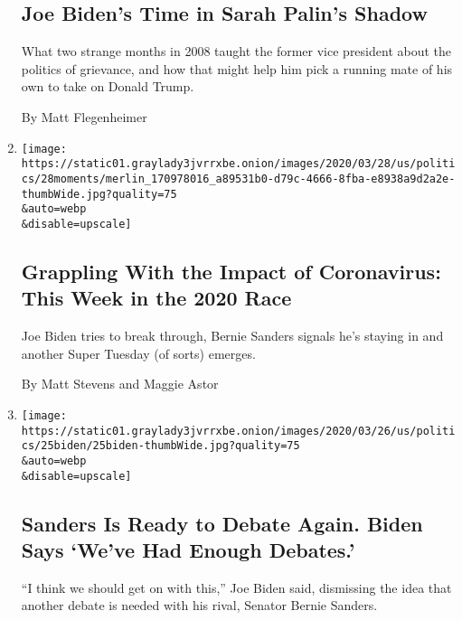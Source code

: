 \begin{enumerate}
  \hypertarget{joe-bidens-time-in-sarah-palins-shadow}{%
  \subsection{Joe Biden's Time in Sarah Palin's
  Shadow}\label{joe-bidens-time-in-sarah-palins-shadow}}

  What two strange months in 2008 taught the former vice president about
  the politics of grievance, and how that might help him pick a running
  mate of his own to take on Donald Trump.

  By Matt Flegenheimer
\item
  \href{/2020/03/28/us/politics/coronavirus-biden-trump-sanders.html}{}

  \texttt{[image: https://static01.graylady3jvrrxbe.onion/images/2020/03/28/us/politics/28moments/merlin\_170978016\_a89531b0-d79c-4666-8fba-e8938a9d2a2e-thumbWide.jpg?quality=75\\\&auto=webp\\\&disable=upscale]}

  \hypertarget{grappling-with-the-impact-of-coronavirus-this-week-in-the-2020-race}{%
  \subsection{Grappling With the Impact of Coronavirus: This Week in the
  2020
  Race}\label{grappling-with-the-impact-of-coronavirus-this-week-in-the-2020-race}}

  Joe Biden tries to break through, Bernie Sanders signals he's staying
  in and another Super Tuesday (of sorts) emerges.

  By Matt Stevens and Maggie Astor
\item
  \href{/2020/03/25/us/politics/bernie-sanders-joe-biden-next-debate.html}{}

  \texttt{[image: https://static01.graylady3jvrrxbe.onion/images/2020/03/26/us/politics/25biden/25biden-thumbWide.jpg?quality=75\\\&auto=webp\\\&disable=upscale]}

  \hypertarget{sanders-is-ready-to-debate-again-biden-says-weve-had-enough-debates}{%
  \subsection{Sanders Is Ready to Debate Again. Biden Says `We've Had
  Enough
  Debates.'}\label{sanders-is-ready-to-debate-again-biden-says-weve-had-enough-debates}}

  ``I think we should get on with this,'' Joe Biden said, dismissing the
  idea that another debate is needed with his rival, Senator Bernie
  Sanders.


\end{enumerate}
